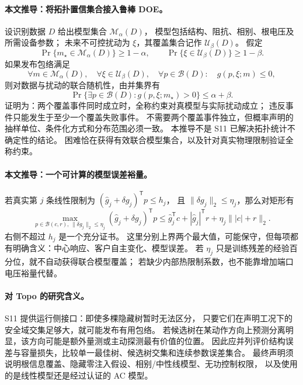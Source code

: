 \documentclass[UTF8,11pt,fontset=fandol]{ctexart}
\theoremstyle{remark}
\numberwithin{equation}{section}
\begin{document}
\paragraph{本文推导：将拓扑置信集合接入鲁棒 DOE。}
设识别数据 $D$ 给出模型集合 $\mathcal M_\alpha(D)$，
模型包括结构、阻抗、相别、根电压及所需设备参数；
未来不可控扰动为 $\xi$，其覆盖集合记作 $\mathcal U_\beta(D)$。
假定
\begin{equation}
 \Pr\{m_\star\in\mathcal M_\alpha(D)\}\geq1-\alpha,
 \qquad
 \Pr\{\xi\in\mathcal U_\beta(D)\}\geq1-\beta.
 \label{eq:eng-s11-coverage}
\end{equation}
如果发布包络满足
\begin{equation}
 \forall m\in\mathcal M_\alpha(D),\quad
 \forall\xi\in\mathcal U_\beta(D),\quad
 \forall p\in\mathcal B(D):\quad g(p,\xi;m)\leq0,
 \label{eq:eng-s11-robust-models}
\end{equation}
则对数据与扰动的联合随机性，由并集界有
\begin{equation}
 \Pr\{\exists p\in\mathcal B(D):g(p,\xi;m_\star)>0\}
 \leq\alpha+\beta.
 \label{eq:eng-s11-union}
\end{equation}
证明为：两个覆盖事件同时成立时，全称约束对真模型与实际扰动成立；
违反事件只能发生于至少一个覆盖失败事件。
不需要两个覆盖事件独立，但概率声明的抽样单位、条件化方式和分布范围必须一致。
本推导不是 S11 已解决拓扑统计不确定性的结论。
困难恰在获得有效联合模型集合，以及针对真实物理限制验证全称约束。

\paragraph{本文推导：一个可计算的模型误差裕量。}
若真实第 $j$ 条线性限制为 $(\widehat g_j+\delta g_j)^{\mathsf T}p\leq h_j$，
且 $\|\delta g_j\|_2\leq\eta_j$，那么对矩形有
\begin{equation}
 \max_{p\in\mathcal B(c,r),\,\|\delta g_j\|_2\leq\eta_j}
 (\widehat g_j+\delta g_j)^{\mathsf T}p
 \leq\widehat g_j^{\mathsf T}c+|\widehat g_j|^{\mathsf T}r
       +\eta_j\big\||c|+r\big\|_2.
 \label{eq:eng-s11-margin}
\end{equation}
右侧不超过 $h_j$ 是一个充分证书。
这里分别上界两个最大值，可能保守，但每项都有明确含义：中心响应、客户自主变化、模型误差。
若 $\eta_j$ 只是训练残差的经验百分位，就不自动获得联合模型覆盖；
若缺少内部热限制系数，也不能靠增加端口电压裕量代替。

\paragraph{对 Topo 的研究含义。}
S11 提供运行侧接口：即使多棵隐藏树暂时无法区分，
只要它们在声明工况下的安全域交集足够大，就可能发布有用包络。
若候选树在某动作方向上预测分离明显，该方向可能是额外量测或主动探测最有价值的位置。
因此应并列评价结构误差与容量损失，比较单一最佳树、候选树交集和连续参数误差集合。
最终声明须说明根信息覆盖、隐藏零注入假设、相别/中性线模型、无功控制权限，
以及使用的是线性模型还是经过认证的 AC 模型。
\end{document}

